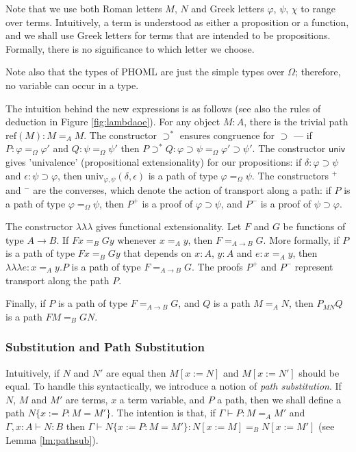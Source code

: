 \documentclass[a4paper,UKenglish]{lipics-v2016}
\newcommand*{\reff}[1]{\ensuremath{\mathrm{ref} \left( {#1} \right)}}
\newcommand*{\univ}[4]{\ensuremath{\mathrm{univ}_{{#1}, {#2}} \left({#3} , {#4} \right)}}
\newcommand*{\triplelambda}{\ensuremath{\lambda \!\! \lambda \!\! \lambda}}
\theoremstyle{plain}
\theoremstyle{definition}
\begin{document}
Note that we use both Roman letters $M$, $N$ and Greek letters $\varphi$, $\psi$, $\chi$ to range over terms.  Intuitively, a term is understood as either a proposition or a function,
and we shall use Greek letters for terms that are intended to be propositions.  Formally, there is no significance to which letter we choose.

Note also that the types of PHOML are just the simple types over $\Omega$; therefore, no variable can occur in a type.

The intuition behind the new expressions is as follows (see also the rules of deduction in Figure \ref{fig:lambdaoe}).  For any object $M : A$, there is the trivial path $\reff{M} : M =_A M$.  The constructor $\supset^*$ ensures congruence for $\supset$ --- if $P : \varphi =_\Omega \varphi'$ and $Q : \psi =_\Omega \psi'$ then $P \supset^* Q : \varphi \supset \psi =_\Omega \varphi' \supset \psi'$.  The constructor $\mathsf{univ}$ gives 'univalence' (propositional extensionality) for our propositions: if $\delta : \varphi \supset \psi$ and $\epsilon : \psi \supset \varphi$, then $\univ{\varphi}{\psi}{\delta}{\epsilon}$ is a path of type $\varphi =_\Omega \psi$.  The constructors $^+$ and $^-$ are the converses, which denote the action of transport along a path: if $P$ is a path of type $\varphi =_\Omega \psi$, then $P^+$ is a proof of $\varphi \supset \psi$, and $P^-$ is a proof of $\psi \supset \varphi$.  

The constructor $\triplelambda$ gives functional extensionality.  Let $F$ and $G$ be functions of type $A \rightarrow B$.  If $F x =_B G y$ whenever $x =_A y$, then $F =_{A \rightarrow B} G$.  More formally, if $P$ is a path of type $Fx =_B Gy$ that depends on $x : A$, $y : A$ and $e : x =_A y$, then $\triplelambda e : x =_A y . P$ is a path of type $F =_{A \rightarrow B} G$.  The proofs $P^+$ and $P^-$ represent transport along the path $P$.

Finally, if $P$ is a path of type $F =_{A \rightarrow B} G$, and $Q$ is a path $M =_A N$, then $P_{MN} Q$ is a path $FM =_B G N$.

\subsubsection{Substitution and Path Substitution}

Intuitively, if $N$ and $N'$ are equal then $M[x:=N]$ and $M[x:=N']$ should be equal.  To handle this syntactically,
we introduce a notion of \emph{path substitution}.  If $N$, $M$ and $M'$ are terms, $x$ a term variable, and $P$ a path, then we shall define a path $N \{ x := P : M = M' \}$.  The intention is that, if
$\Gamma \vdash P : M =_A M'$ and $\Gamma, x : A \vdash N : B$ then $\Gamma \vdash N \{ x := P : M = M' \} : N [ x:= M ] =_B N [ x := M' ]$ (see Lemma \ref{lm:pathsub}). 
\end{document}
